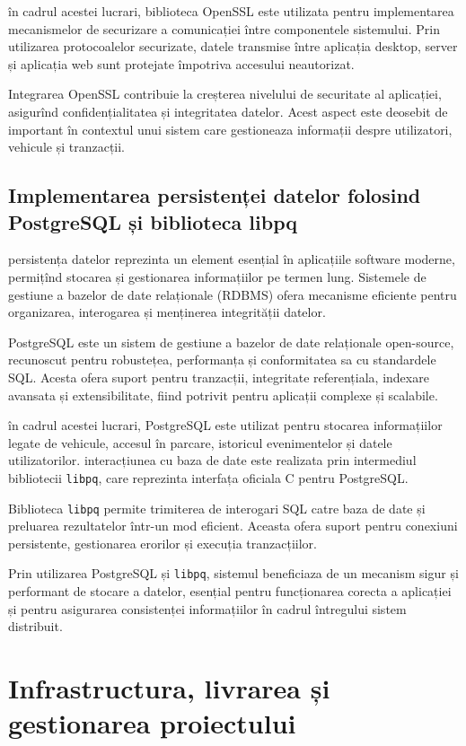 în cadrul acestei lucrari, biblioteca OpenSSL este utilizata pentru implementarea mecanismelor de securizare a comunicației între componentele sistemului. Prin utilizarea protocoalelor securizate, datele transmise între aplicația desktop, server și aplicația web sunt protejate împotriva accesului neautorizat.

Integrarea OpenSSL contribuie la creșterea nivelului de securitate al aplicației, asigurînd confidențialitatea și integritatea datelor. Acest aspect este deosebit de important în contextul unui sistem care gestioneaza informații despre utilizatori, vehicule și tranzacții.

\subsection*{Implementarea persistenței datelor folosind PostgreSQL și biblioteca libpq}

persistența datelor reprezinta un element esențial în aplicațiile software moderne, permițînd stocarea și gestionarea informațiilor pe termen lung. Sistemele de gestiune a bazelor de date relaționale (RDBMS) ofera mecanisme eficiente pentru organizarea, interogarea și menținerea integrității datelor.

PostgreSQL este un sistem de gestiune a bazelor de date relaționale open-source, recunoscut pentru robustețea, performanța și conformitatea sa cu standardele SQL. Acesta ofera suport pentru tranzacții, integritate referențiala, indexare avansata și extensibilitate, fiind potrivit pentru aplicații complexe și scalabile.

în cadrul acestei lucrari, PostgreSQL este utilizat pentru stocarea informațiilor legate de vehicule, accesul în parcare, istoricul evenimentelor și datele utilizatorilor. interacțiunea cu baza de date este realizata prin intermediul bibliotecii \texttt{libpq}, care reprezinta interfața oficiala C pentru PostgreSQL.

Biblioteca \texttt{libpq} permite trimiterea de interogari SQL catre baza de date și preluarea rezultatelor într-un mod eficient. Aceasta ofera suport pentru conexiuni persistente, gestionarea erorilor și execuția tranzacțiilor.

Prin utilizarea PostgreSQL și \texttt{libpq}, sistemul beneficiaza de un mecanism sigur și performant de stocare a datelor, esențial pentru funcționarea corecta a aplicației și pentru asigurarea consistenței informațiilor în cadrul întregului sistem distribuit.

\section{Infrastructura, livrarea și gestionarea proiectului}

